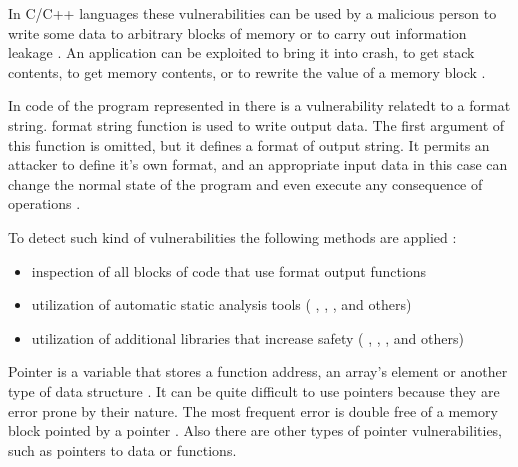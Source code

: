 %
In C/C++ languages these vulnerabilities can be used by a malicious person to write some data to arbitrary blocks of memory or to carry out information leakage . 
%
An application can be exploited to bring it into crash, to get stack contents, to get memory contents, or to rewrite the value of a memory block   . 

%
In code of the program represented in  there is a vulnerability relatedt to a format string. 
%
 format string function is used to write output data. 
%
The first argument of this function is omitted, but it defines a format of output string. 
%
It permits an attacker to define it's own format, and an appropriate input data in this case can change the normal state of the program and even execute any consequence of operations . 

%
To detect such kind of vulnerabilities the following methods are applied  : 
\begin{itemize}
	\item inspection of all blocks of code that use format output functions
	\item utilization of automatic static analysis tools ( ,  ,  , and others) 
	\item utilization of additional libraries that increase safety ( ,  ,  , and others)
\end{itemize}



%
Pointer is a variable that stores a function address, an array's element or another type of data structure . 
%
It can be quite difficult to use pointers because they are error prone by their nature. 
%
The most frequent error is double free of a memory block pointed by a pointer . 
%
Also there are other types of pointer vulnerabilities, such as pointers to data or functions. 

